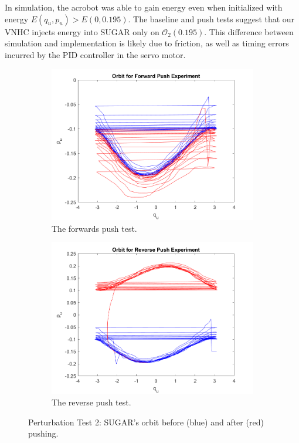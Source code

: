 \documentclass[journal,twoside,web]{ieeecolor}
\begin{document}
{In simulation, the acrobot was able to gain energy even when initialized
with energy \(E(q_u,p_u) > E(0,0.195)\). 
The baseline and push tests suggest that our VNHC injects energy into SUGAR
only on \(\mathcal{O}_2(0.195)\).
This difference between simulation and implementation is likely due to
friction, as well as timing errors incurred by the PID controller in the servo
motor.

\begin{figure}
    \centering
    \begin{subfigure}[ht]{0.49\linewidth}
        \includegraphics[width=\linewidth]{acrobot_fpush_orbit.png}
        \caption{The forwards push test.}
        \label{fig:acrobot-fpush-orbit}
    \end{subfigure}
    \begin{subfigure}[ht]{0.49\linewidth}
        \includegraphics[width=\linewidth]{acrobot_rpush_orbit.png}
        \caption{The reverse push test.}
        \label{fig:acrobot-rpush-orbit}
    \end{subfigure}
    \caption{Perturbation Test 2: SUGAR's orbit before (blue) and after (red) pushing.}
\end{figure}

}
\end{document}
